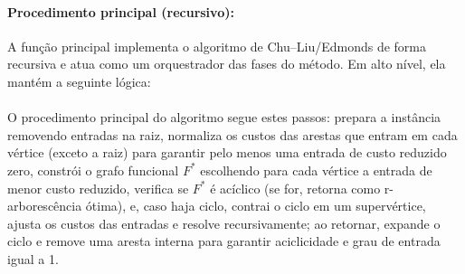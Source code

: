 \documentclass[12pt,a4paper]{article}
\def\emph#1{#1}%
\begin{document}
\paragraph{Procedimento principal (recursivo):}
A função principal implementa o algoritmo de Chu–Liu/Edmonds de forma recursiva e atua como um orquestrador das fases do método. Em alto nível, ela mantém a seguinte lógica:






\paragraph{}
O procedimento principal do algoritmo segue estes passos: prepara a instância removendo entradas na raiz, normaliza os custos das arestas que entram em cada vértice (exceto a raiz) para garantir pelo menos uma entrada de custo reduzido zero, constrói o grafo funcional $F^*$ escolhendo para cada vértice a entrada de menor custo reduzido, verifica se $F^*$ é acíclico (se for, retorna como r-arborescência ótima), e, caso haja ciclo, contrai o ciclo em um supervértice, ajusta os custos das entradas e resolve recursivamente; ao retornar, expande o ciclo e remove uma aresta interna para garantir aciclicidade e grau de entrada igual a 1.
\end{document}
